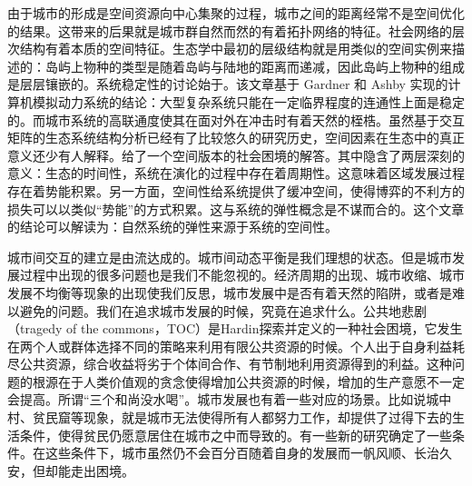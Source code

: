 


由于城市的形成是空间资源向中心集聚的过程，城市之间的距离经常不是空间优化的结果。这带来的后果就是城市群自然而然的有着拓扑网络的特征。社会网络的层次结构有着本质的空间特征。生态学中最初的层级结构就是用类似的空间实例来描述的：岛屿上物种的类型是随着岛屿与陆地的距离而递减，因此岛屿上物种的组成是层层镶嵌的。系统稳定性的讨论始于\cite{may1972will}。该文章基于 Gardner 和 Ashby 实现的计算机模拟动力系统的结论：大型复杂系统只能在一定临界程度的连通性上面是稳定的。而城市系统的高联通度使其在面对外在冲击时有着天然的桎梏。虽然基于交互矩阵的生态系统结构分析已经有了比较悠久的研究历史，空间因素在生态中的真正意义还少有人解释。\cite{lin2019spatial}给了一个空间版本的社会困境的解答。其中隐含了两层深刻的意义：生态的时间性，系统在演化的过程中存在着周期性。这意味着区域发展过程存在着势能积累。另一方面，空间性给系统提供了缓冲空间，使得博弈的不利方的损失可以以类似“势能”的方式积累。这与系统的弹性\cite{gao2016universal}概念是不谋而合的。这个文章的结论可以解读为：自然系统的弹性来源于系统的空间性。

城市间交互的建立是由流达成的。城市间动态平衡是我们理想的状态。但是城市发展过程中出现的很多问题也是我们不能忽视的。经济周期的出现、城市收缩、城市发展不均衡等现象的出现使我们反思，城市发展中是否有着天然的陷阱，或者是难以避免的问题。我们在追求城市发展的时候，究竟在追求什么。公共地悲剧（tragedy of the commons，TOC）是Hardin\cite{hardin1968tragedy}探索并定义的一种社会困境，它发生在两个人或群体选择不同的策略来利用有限公共资源的时候。个人出于自身利益耗尽公共资源，综合收益将劣于个体间合作、有节制地利用资源得到的利益。这种问题的根源在于人类价值观的贪念使得增加公共资源的时候，增加的生产意愿不一定会提高。所谓“三个和尚没水喝”。城市发展也有着一些对应的场景。比如说城中村、贫民窟等现象，就是城市无法使得所有人都努力工作，却提供了过得下去的生活条件，使得贫民仍愿意居住在城市之中而导致的。有一些新的研究确定了一些条件。在这些条件下，城市虽然仍不会百分百随着自身的发展而一帆风顺、长治久安，但却能走出困境\cite{lin2019spatial}。


